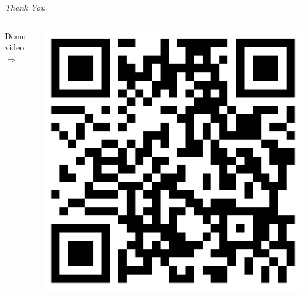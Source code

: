 

\section*{\phantom{Thanks}}

\begin{frame}{}

  \vspace{6ex}

  \centering
  {
    \Huge
    \emph{Thank You}
  }

  \vspace{6ex}

  \begin{columns}

    \hspace{-27ex}

    \begin{column}{0.5\textwidth}
      \raggedleft
      {\Large Demo video $\Longrightarrow$}
    \end{column}

    \hspace{-12ex}

    \begin{column}{0.5\textwidth}
      \includegraphics[width=0.5\linewidth]{figures/demo_qr_code.png}
    \end{column}

  \end{columns}

\end{frame}
